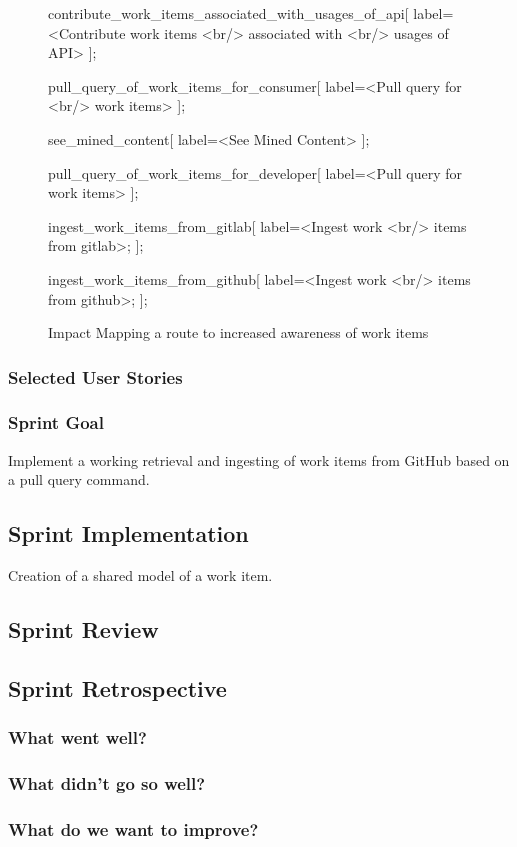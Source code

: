\begin{figure}[!h]
{		contribute_work_items_associated_with_usages_of_api[
			label=<Contribute work items <br/> associated with <br/> usages of API>
		];
		
		pull_query_of_work_items_for_consumer[
			label=<Pull query for <br/> work items>
		];
		
		see_mined_content[
			label=<See Mined Content>
		];
		
		pull_query_of_work_items_for_developer[
			label=<Pull query for work items>
		]; 
		
		ingest_work_items_from_gitlab[
			label=<Ingest work <br/> items from gitlab>;
		];
		
		ingest_work_items_from_github[
			label=<Ingest work <br/> items from github>;
		];
	}
	\label{fig:workItemsImpactMap}
	\caption{Impact Mapping a route to increased awareness of work items}
\end{figure}

\subsubsection{Selected User Stories}

\subsubsection{Sprint Goal}

Implement a working retrieval and ingesting of work items from GitHub based on a pull query command.

\subsection{Sprint Implementation}

Creation of a shared model of a work item.

\subsection{Sprint Review}

\subsection{Sprint Retrospective}

\subsubsection{What went well?}

\subsubsection{What didn't go so well?}

\subsubsection{What do we want to improve?}
